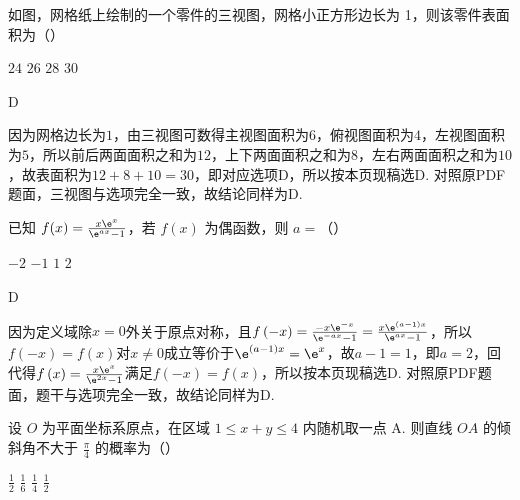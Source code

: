\begin{problem}
如图，网格纸上绘制的一个零件的三视图，网格小正方形边长为 1，则该零件表面积为（\quad）

\begin{center}
\end{center}

\choices
    {\(24\)}
    {\(26\)}
    {\(28\)}
    {\(30\)}
\end{problem}

\begin{answer}
D
\end{answer}

\begin{solution}
因为网格边长为\(1\)，由三视图可数得主视图面积为\(6\)，俯视图面积为\(4\)，左视图面积为\(5\)，所以前后两面面积之和为\(12\)，上下两面面积之和为\(8\)，左右两面面积之和为\(10\)，故表面积为\(12+8+10=30\)，即对应选项D，所以按本页现稿选D. 对照原PDF题面，三视图与选项完全一致，故结论同样为D.
\end{solution}

\begin{problem}
已知 \(f(x)=\frac{x \e^x}{\e^{ax}-1}\)，若 \(f(x)\) 为偶函数，则 \(a=\)（\quad）

\choices
    {\(-2\)}
    {\(-1\)}
    {\(1\)}
    {\(2\)}
\end{problem}

\begin{answer}
D
\end{answer}

\begin{solution}
因为定义域除\(x=0\)外关于原点对称，且\(f\left(-x\right)=\frac{-x\e^{-x}}{\e^{-ax}-1}=\frac{x\e^{\left(a-1\right)x}}{\e^{ax}-1}\)，所以\(f\left(-x\right)=f\left(x\right)\)对\(x\ne 0\)成立等价于\(\e^{\left(a-1\right)x}=\e^{x}\)，故\(a-1=1\)，即\(a=2\)，回代得\(f\left(x\right)=\frac{x\e^{x}}{\e^{2x}-1}\)满足\(f\left(-x\right)=f\left(x\right)\)，所以按本页现稿选D. 对照原PDF题面，题干与选项完全一致，故结论同样为D.
\end{solution}

\begin{problem}
设 \(O\) 为平面坐标系原点，在区域 \(1\le x+y\le4\) 内随机取一点 A. 则直线 \(OA\) 的倾斜角不大于 \(\frac\pi4\) 的概率为（\quad）

\choices
    {\(\frac12\)}
    {\(\frac16\)}
    {\(\frac14\)}
    {\(\frac12\)}
\end{problem}

